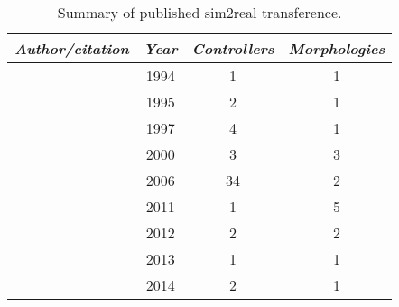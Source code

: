 
\begin{table}[t]
\footnotesize
\caption{\label{table:lit_review}Summary of published sim2real transference.}
\vspace{-1.25em}
\begin{center}
\begin{tabular}{lccc} 
    \toprule
    \textit{Author/citation} & \textit{Year} & \textit{Controllers} & \textit{Morphologies} \\ 
    \midrule
    
    \citet{Miglino1994Selection}    & 1994 & 1 & 1 \\  %
    \citet{jakobi1995noise}         & 1995 & 2 & 1 \\  %
    
    
    \citet{HARVEY1997205}           & 1997 & 4 & 1 \\  %
    
    \citet{lipson2000automatic}     & 2000 & 3 & 3 \\
    
    \citet{bongard2006resilient}    & 2006 & 34 & 2 \\
    
    \citet{hiller2011automatic}     & 2011 & 1 & 5 \\ 
    
    \citet{koos2012transferability} & 2012 & 2 & 2 \\ 
    
    \citet{moeckel2013gait}         & 2013 & 1 & 1 \\  %
    
    \citet{caluwaerts2014design}    & 2014 & 2 & 1 \\ %
    

\end{tabular}
\end{center}
\end{table}

